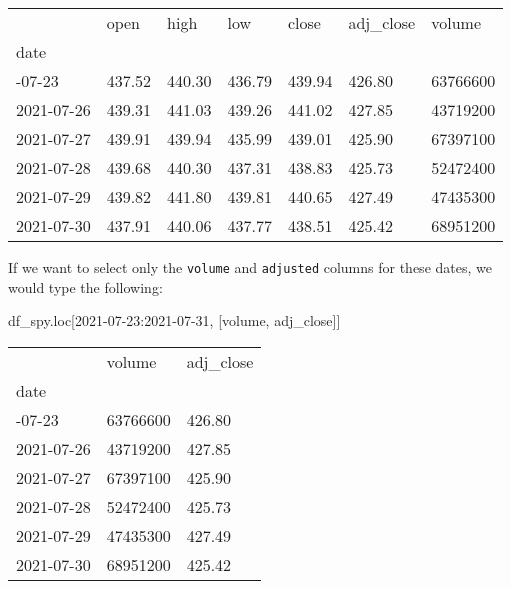 \documentclass[
  letterpaper,
  DIV=11,
  numbers=noendperiod]{scrreprt}
\newenvironment{Shaded}{\begin{snugshade}}{\end{snugshade}}
\newcommand{\NormalTok}[1]{\textcolor[rgb]{0.00,0.23,0.31}{#1}}
\newcommand{\StringTok}[1]{\textcolor[rgb]{0.13,0.47,0.30}{#1}}
\begin{document}
\begin{longtable}[]{@{}lllllll@{}}
\toprule\noalign{}
& open & high & low & close & adj\_close & volume \\
date & & & & & & \\
\midrule\noalign{}
\endhead
\bottomrule\noalign{}
\endlastfoot
2021-07-23 & 437.52 & 440.30 & 436.79 & 439.94 & 426.80 & 63766600 \\
2021-07-26 & 439.31 & 441.03 & 439.26 & 441.02 & 427.85 & 43719200 \\
2021-07-27 & 439.91 & 439.94 & 435.99 & 439.01 & 425.90 & 67397100 \\
2021-07-28 & 439.68 & 440.30 & 437.31 & 438.83 & 425.73 & 52472400 \\
2021-07-29 & 439.82 & 441.80 & 439.81 & 440.65 & 427.49 & 47435300 \\
2021-07-30 & 437.91 & 440.06 & 437.77 & 438.51 & 425.42 & 68951200 \\
\end{longtable}

If we want to select only the \texttt{volume} and \texttt{adjusted}
columns for these dates, we would type the following:

\begin{Shaded}
\begin{Highlighting}[]
\NormalTok{df\_spy.loc[}\StringTok{\textquotesingle{}2021{-}07{-}23\textquotesingle{}}\NormalTok{:}\StringTok{\textquotesingle{}2021{-}07{-}31\textquotesingle{}}\NormalTok{, [}\StringTok{\textquotesingle{}volume\textquotesingle{}}\NormalTok{, }\StringTok{\textquotesingle{}adj\_close\textquotesingle{}}\NormalTok{]]}
\end{Highlighting}
\end{Shaded}

\begin{longtable}[]{@{}lll@{}}
\toprule\noalign{}
& volume & adj\_close \\
date & & \\
\midrule\noalign{}
\endhead
\bottomrule\noalign{}
\endlastfoot
2021-07-23 & 63766600 & 426.80 \\
2021-07-26 & 43719200 & 427.85 \\
2021-07-27 & 67397100 & 425.90 \\
2021-07-28 & 52472400 & 425.73 \\
2021-07-29 & 47435300 & 427.49 \\
2021-07-30 & 68951200 & 425.42 \\
\end{longtable}
\end{document}
